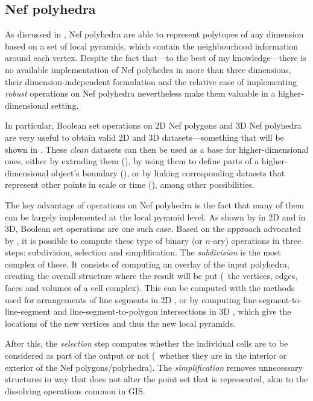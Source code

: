 \subsection{Nef polyhedra}
\label{ss:operations-nef}

As discussed in , Nef polyhedra \citep{Nef78,Bieri88} are able to represent polytopes of any dimension based on a set of local pyramids, which contain the neighbourhood information around each vertex.
Despite the fact that---to the best of my knowledge---there is no available implementation of Nef polyhedra in more than three dimensions, their dimension-independent formulation and the relative ease of implementing \emph{robust} operations on Nef polyhedra nevertheless make them valuable in a higher-dimensional setting.

In particular, Boolean set operations on 2D Nef polygons and 3D Nef polyhedra are very useful to obtain valid 2D and 3D datasets---something that will be shown in .
These \emph{clean} datasets can then be used as a base for higher-dimensional ones, either by extruding them (), by using them to define parts of a higher-dimensional object's boundary (), or by linking corresponding datasets that represent other points in scale or time (), among other possibilities.

The key advantage of operations on Nef polyhedra is the fact that many of them can be largely implemented at the local pyramid level.
As shown by \citet{Seel01} in 2D and \citet{Hachenberger06} in 3D, Boolean set operations are one such case.
Based on the approach advocated by \citet{Rossignac89}, it is possible to compute these type of binary (or $n$-ary) operations in three steps: subdivision, selection and simplification.
The \emph{subdivision} is the most complex of these.
It consists of computing an overlay of the input polyhedra, creating the overall structure where the result will be put (\eg\ the vertices, edges, faces and volumes of a cell complex).
This can be computed with the methods used for arrangements of line segments in 2D \citep[\S{}8.3]{deBerg08}, or by computing line-segment-to-line-segment and line-segment-to-polygon intersections in 3D \citep{Hachenberger06}, which give the locations of the new vertices and thus the new local pyramids.

After this, the \emph{selection} step computes whether the individual cells are to be considered as part of the output or not (\ie\ whether they are in the interior or exterior of the Nef polygons/polyhedra).
The \emph{simplification} removes unnecessary structures in way that does not alter the point set that is represented, akin to the dissolving operations common in GIS.\@

